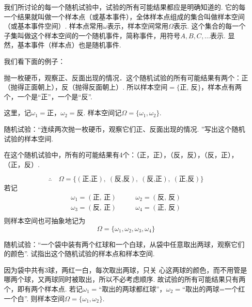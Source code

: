我们所讨论的每一个随机试验中，试验的所有可能结果都应是明确知道的. 它的每一个结果就叫做一个样本点（或基本事件），全体样本点组成的集合叫做样本空间（或基本事件空间）. 样本点常用$\omega$表示，样本空间常用$\Omega$表示. 这个集合的每一个子集叫做这个样本空间的一个随机事件，简称事件，用符号$A,B,C,\ldots$表示. 显然，基本事件（样本点）也是随机事件. 

我们看下面的例子：

\begin{example}
    抛一枚硬币，观察正、反面出现的情况．这个随机试验的所有可能结果有两个：正（抛得正面朝上），反（抛得反面朝上）. 所以样本空间$=\{\text{正, 反}\}$，样本点有两个，一个是“正”，一个是“反”. 

这里，记$\omega_1=\text{正}$，$\omega_2=\text{反}$. 样本空间记$\Omega=\{\omega_1,\omega_2\}$. 
\end{example}
  
\begin{example}
    随机试验：“连续两次抛一枚硬币，观察它们正、反面出现的情况. ”写出这个随机试验的样本空间. 
\end{example}

\begin{solution}
    在这个随机试验中，所有的可能结果有4个：（正，正），（反，反），（反，正），（正，反）. 
    
\[\therefore\quad \Omega=\{(\text{正,正}),\; (\text{反,反}),\; (\text{反,正}),\; (\text{正,反})\}\]
若记
\[\begin{split}
    \omega_1=(\text{正, 正})&\qquad \omega_2=(\text{反, 反})\\
    \omega_3=(\text{反, 正})&\qquad \omega_4=(\text{正, 反})\\
\end{split}\]
则样本空间也可抽象地记为
\[\Omega =\{\omega_1,\omega_2,\omega_3,\omega_4\}\]
\end{solution}

\begin{example}
    随机试验：“一个袋中装有两个红球和一个白球，从袋中任意取出两球，观察它们的颜色”. 试指出这个随机试验的样本点和样本空间. 
\end{example}

\begin{solution}
因为袋中共有3球，两红一白，每次取出两球，只关
  心这两球的颜色，而不用管是哪两个球，又两球同时被取出，所以不必考虑顺序. 故试验的所有可能结果只有两个，即有两个样本点. 若记$\omega_1=$“取出的两球都红球”，$\omega_2=$“取出的两球=一个红一个白”. 则样本空间$\Omega=\{\omega_1,\omega_2\}$. 
\end{solution}

